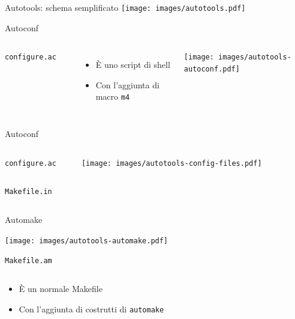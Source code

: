 \documentclass[xetex,table]{beamer}
\begin{document}
\begin{frame}{Autotools: schema semplificato}
  \center\texttt{[image: images/autotools.pdf]}
\end{frame}

\begin{frame}[fragile]{Autoconf}
  \begin{columns}
    \texttt{configure.ac}
    \inputminted[bgcolor=codebackground,frame=single]{shell}{examples/3-autotools-1/configure.ac}

    \begin{itemize}
    \item È uno script di shell
    \item Con l'aggiunta di macro \texttt{m4}
    \end{itemize}

    \texttt{[image: images/autotools-autoconf.pdf]}
  \end{columns}
\end{frame}

\begin{frame}{Autoconf}
  \small

  \begin{columns}
    \texttt{configure.ac}
    \inputminted[bgcolor=codebackground,frame=single]{shell}{examples/3-autotools-2/configure.ac}

    \texttt{[image: images/autotools-config-files.pdf]}
  \end{columns}

  \texttt{Makefile.in}
  \inputminted[bgcolor=codebackground,frame=single]{makefile}{examples/3-autotools-2/Makefile.in}
\end{frame}

\begin{frame}{Automake}
  \begin{flushright}
    \texttt{[image: images/autotools-automake.pdf]}
  \end{flushright}

  \texttt{Makefile.am}
  \inputminted[bgcolor=codebackground,frame=single]{makefile}{examples/3-autotools-3/Makefile.am}

  \begin{itemize}
  \item È un normale Makefile
  \item Con l'aggiunta di costrutti di \texttt{automake}
  \end{itemize}
\end{frame}
\end{document}
